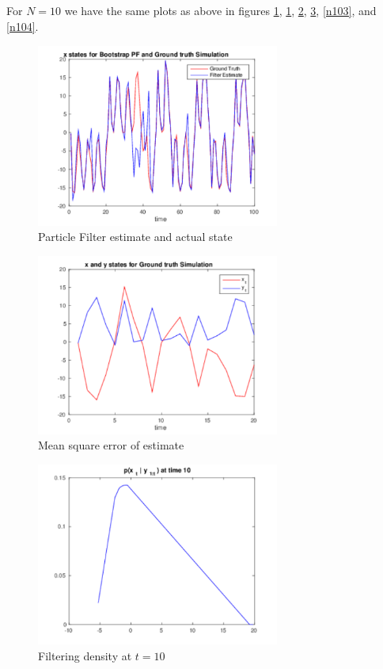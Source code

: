 \documentclass[11pt]{article}
\begin{document}
\subsection{}

For $N=10$ we have the same plots as above in figures \ref{n10gtbt}, \ref{n10gtbt}, \ref{n101}, \ref{n102}, \ref{n103}, and \ref{n104}.

\begin{figure}[h]
  
  \centering
    \includegraphics[width=80mm]{../figs/008_15_gt-and-bt.pdf}
    \caption{Particle Filter estimate and actual state}
    \label{n10gtbt}
\end{figure}

\begin{figure}[h]
  
  \centering
    \includegraphics[width=80mm]{../figs/009_13_mse.pdf}
    \caption{Mean square error of estimate}
    \label{n101}
\end{figure}

\begin{figure}[h]
  
  \centering
    \includegraphics[width=80mm]{../figs/010_15_t10N10.pdf}
    \caption{Filtering density at $t=10$}
    \label{n102}
\end{figure}
\end{document}
